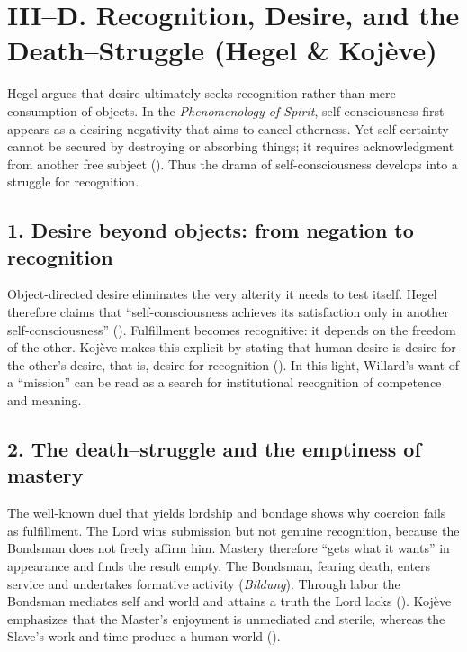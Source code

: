 \section*{III--D. Recognition, Desire, and the Death--Struggle (Hegel \& Koj{\`e}ve)}
\label{sec:iii-d-recognition-desire-and-the-death-struggle-hegel-koj-e-ve}

Hegel argues that desire ultimately seeks recognition rather than mere consumption of objects. In the \emph{Phenomenology of Spirit}, self-consciousness first appears as a desiring negativity that aims to cancel otherness. Yet self-certainty cannot be secured by destroying or absorbing things; it requires acknowledgment from another free subject (\parencite[§§ 167--175]{HegelPhenomenology1977}). Thus the drama of self-consciousness develops into a struggle for recognition.

\subsection*{1. Desire beyond objects: from negation to recognition}
\label{ssec:1-desire-beyond-objects-from-negation-to-recognition}
Object-directed desire eliminates the very alterity it needs to test itself. Hegel therefore claims that ``self-consciousness achieves its satisfaction only in another self-consciousness'' (\parencite{HegelPhenomenology1977}). Fulfillment becomes recognitive: it depends on the freedom of the other. Koj{\`e}ve makes this explicit by stating that human desire is desire for the other's desire, that is, desire for recognition (\parencite[p.~6]{KojeveIRH1980}). In this light, Willard's want of a ``mission'' can be read as a search for institutional recognition of competence and meaning.

\subsection*{2. The death--struggle and the emptiness of mastery}
\label{ssec:2-the-death-struggle-and-the-emptiness-of-mastery}
The well-known duel that yields lordship and bondage shows why coercion fails as fulfillment. The Lord wins submission but not genuine recognition, because the Bondsman does not freely affirm him. Mastery therefore ``gets what it wants'' in appearance and finds the result empty. The Bondsman, fearing death, enters service and undertakes formative activity (\emph{Bildung}). Through labor the Bondsman mediates self and world and attains a truth the Lord lacks (\parencite[\S 175]{HegelPhenomenology1977}). Koj{\`e}ve emphasizes that the Master's enjoyment is unmediated and sterile, whereas the Slave's work and time produce a human world (\parencite{KojeveIRH1980}).

